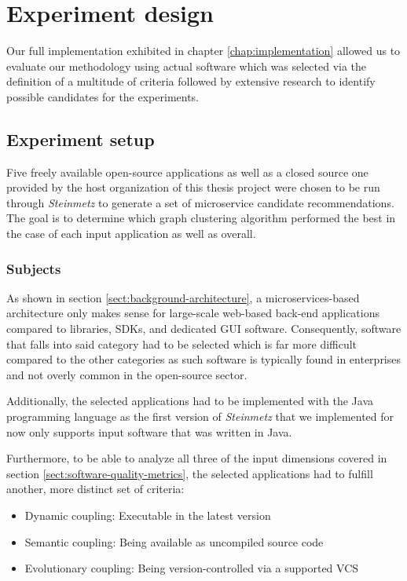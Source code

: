 \documentclass[12pt,a4paper]{report}
\begin{document}
\chapter{Experiment design} \label{chap:experiment-design}

Our full implementation exhibited in chapter \ref{chap:implementation} allowed us
to evaluate our methodology using actual software which was selected via the
definition of a multitude of criteria followed by extensive research to identify
possible candidates for the experiments.



\section{Experiment setup}

Five freely available open-source applications as well as a closed source one
provided by the host organization of this thesis project were chosen to be run through
\textit{Steinmetz} to generate a set of microservice candidate recommendations.
The goal is to determine which graph clustering algorithm performed the best in the case
of each input application as well as overall.


\subsection{Subjects}

As shown in section \ref{sect:background-architecture}, a microservices\hyp based
architecture only makes sense for large\hyp scale web\hyp based back\hyp end
applications compared to libraries, SDKs, and dedicated GUI software.
Consequently, software that falls into said category had to be selected which
is far more difficult compared to the other categories as such software is
typically found in enterprises and not overly common in the open-source sector.

Additionally, the selected applications had to be implemented with the Java
programming language as the first version of \textit{Steinmetz} that we implemented
for now only supports input software that was written in Java.

Furthermore, to be able to analyze all three of the input dimensions covered in
section \ref{sect:software-quality-metrics}, the selected applications had to fulfill
another, more distinct set of criteria:

\begin{itemize}[noitemsep]
    \item Dynamic coupling: Executable in the latest version
    \item Semantic coupling: Being available as uncompiled source code
    \item Evolutionary coupling: Being version-controlled via a supported VCS
\end{itemize}
\end{document}
